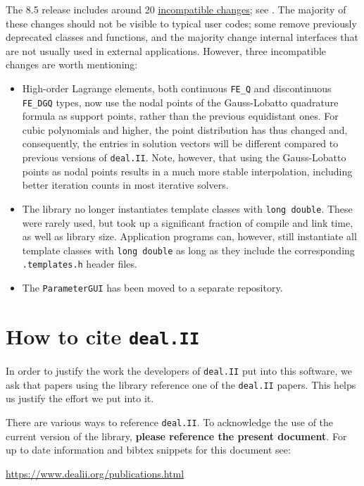 \documentclass{ansarticle-preprint}
\newcommand{\specialword}[1]{\texttt{#1}}
\newcommand{\dealii}{{\specialword{deal.II}}}
\begin{document}
The 8.5 release includes around 20
\href{https://www.dealii.org/developer/doxygen/deal.II/changes_between_8_4_and_8_5.html}{
incompatible changes}; see \cite{changes85}. The majority of these changes
should not be visible to typical user codes; some remove previously
deprecated classes and functions, and the majority change internal
interfaces that are not usually used in external applications. However, three
incompatible changes are worth mentioning:
\begin{itemize}
  \item High-order Lagrange elements, both continuous \verb!FE_Q! and
    discontinuous \verb!FE_DGQ! types, now use the nodal points of the
    Gauss-Lobatto quadrature formula as support points, rather than the
    previous equidistant ones. For cubic polynomials and higher, the point
    distribution has thus changed and, consequently, the entries in
    solution vectors will be different compared to previous
    versions of \dealii{}. Note, however, that using the Gauss-Lobatto points as nodal
    points results in a much more stable interpolation, including better
    iteration counts in most iterative solvers.
  \item
    The library no longer instantiates template classes with \texttt{long
    double}. These were rarely used, but took up a significant
    fraction of compile and link time, as well as library
    size. Application programs can, however, still instantiate all
    template classes with \texttt{long
    double} as long as they include the corresponding \texttt{.templates.h}
    header files.
  \item
    The \texttt{ParameterGUI} has been moved to a separate repository.
\end{itemize}



\section{How to cite \dealii{}}\label{sec:cite}

In order to justify the work the developers of \dealii{} put into this
software, we ask that papers using the library reference one of the
\dealii{} papers. This helps us justify the effort we put into it.

There are various ways to reference \dealii{}. To acknowledge the use of the
current version of the library, \textbf{please reference the present document}. For up
to date information and bibtex snippets for this document see:
\begin{center}
 \url{https://www.dealii.org/publications.html}
\end{center}
\end{document}
